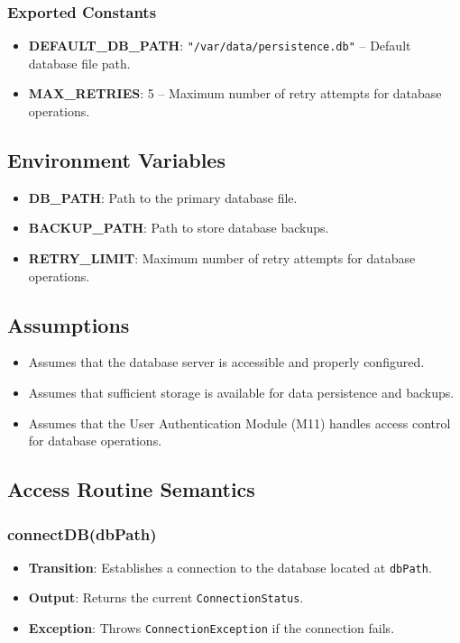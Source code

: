 \documentclass[12pt, titlepage]{article}
\begin{document}
\subsubsection{Exported Constants}
\begin{itemize}
    \item \textbf{DEFAULT\_DB\_PATH}: \texttt{"/var/data/persistence.db"} -- Default database file path.
    \item \textbf{MAX\_RETRIES}: 5 -- Maximum number of retry attempts for database operations.
\end{itemize}

\subsection{Environment Variables}
\begin{itemize}
    \item \textbf{DB\_PATH}: Path to the primary database file.
    \item \textbf{BACKUP\_PATH}: Path to store database backups.
    \item \textbf{RETRY\_LIMIT}: Maximum number of retry attempts for database operations.
\end{itemize}

\subsection{Assumptions}
\begin{itemize}
    \item Assumes that the database server is accessible and properly configured.
    \item Assumes that sufficient storage is available for data persistence and backups.
    \item Assumes that the User Authentication Module (M11) handles access control for database operations.
\end{itemize}

\subsection{Access Routine Semantics}

\subsubsection{connectDB(dbPath)}
\begin{itemize}
    \item \textbf{Transition}: Establishes a connection to the database located at \texttt{dbPath}.
    \item \textbf{Output}: Returns the current \texttt{ConnectionStatus}.
    \item \textbf{Exception}: Throws \texttt{ConnectionException} if the connection fails.
\end{itemize}
\end{document}
